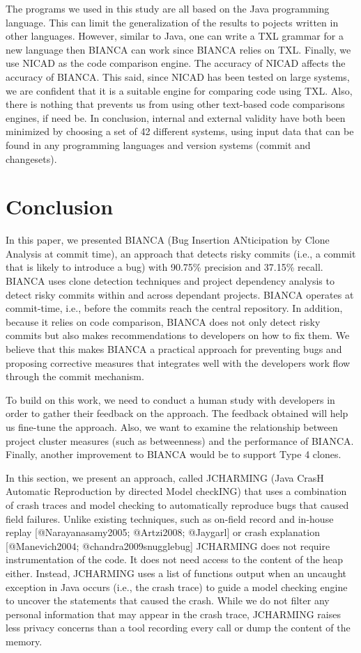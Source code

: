 The programs we used in this study are all based on the Java programming
language. This can limit the generalization of the results to pojects
written in other languages. However, similar to Java, one can write a
TXL grammar for a new language then BIANCA can work since BIANCA relies
on TXL. Finally, we use NICAD as the code comparison engine. The
accuracy of NICAD affects the accuracy of BIANCA. This said, since NICAD
has been tested on large systems, we are confident that it is a suitable
engine for comparing code using TXL. Also, there is nothing that
prevents us from using other text-based code comparisons engines, if
need be. In conclusion, internal and external validity have both been
minimized by choosing a set of 42 different systems, using input data
that can be found in any programming languages and version systems
(commit and changesets).

\section{Conclusion}\label{sec:conclusion}

In this paper, we presented BIANCA (Bug Insertion ANticipation by Clone
Analysis at commit time), an approach that detects risky commits (i.e.,
a commit that is likely to introduce a bug) with 90.75\% precision and
37.15\% recall. BIANCA uses clone detection techniques and project
dependency analysis to detect risky commits within and across dependant
projects. BIANCA operates at commit-time, i.e., before the commits reach
the central repository. In addition, because it relies on code
comparison, BIANCA does not only detect risky commits but also makes
recommendations to developers on how to fix them. We believe that this
makes BIANCA a practical approach for preventing bugs and proposing
corrective measures that integrates well with the developers work flow
through the commit mechanism.

To build on this work, we need to conduct a human study with developers
in order to gather their feedback on the approach. The feedback obtained
will help us fine-tune the approach. Also, we want to examine the
relationship between project cluster measures (such as betweenness) and
the performance of BIANCA. Finally, another improvement to BIANCA would
be to support Type 4 clones.

In this section, we present an approach, called {JCHARMING} (Java CrasH
Automatic Reproduction by directed Model checkING) that uses a
combination of crash traces and model checking to automatically
reproduce bugs that caused field failures. Unlike existing techniques,
such as on-field record and in-house replay {[}@Narayanasamy2005;
@Artzi2008; @Jaygarl{]} or crash explanation {[}@Manevich2004;
@chandra2009snugglebug{]} JCHARMING does not require instrumentation of
the code. It does not need access to the content of the heap either.
Instead, JCHARMING uses a list of functions output when an uncaught
exception in Java occurs (i.e., the crash trace) to guide a model
checking engine to uncover the statements that caused the crash. While
we do not filter any personal information that may appear in the crash
trace, JCHARMING raises less privacy concerns than a tool recording
every call or dump the content of the memory.

